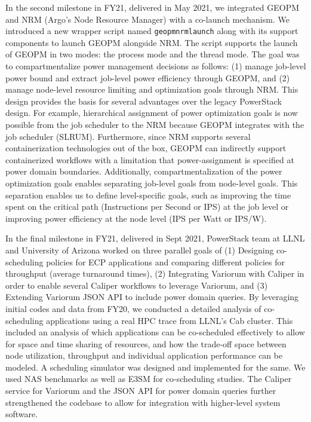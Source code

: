 In the second milestone in FY21, delivered in May 2021, we integrated GEOPM and NRM (Argo's Node Resource Manager) with a co-launch mechanism. We introduced a new wrapper script named \texttt{geopmnrmlaunch} along with its support components to launch GEOPM alongside NRM. The script supports the launch of GEOPM in two modes: the process mode and the thread mode. The goal was to compartmentalize power management decisions as follows: (1) manage job-level power bound and extract job-level power efficiency through GEOPM, and (2) manage node-level resource limiting and optimization goals through NRM. This design provides the basis for several advantages over the legacy PowerStack design. For example, hierarchical assignment of power optimization goals is now possible from the job scheduler to the NRM because GEOPM integrates with the job scheduler (SLRUM). Furthermore, since NRM supports several containerization technologies out of the box, GEOPM can indirectly support containerized workflows with a limitation that power-assignment is specified at power domain boundaries. Additionally, compartmentalization of the power optimization goals enables separating job-level goals from node-level goals. This separation enables us to define level-specific goals, such as improving the time spent on the critical path (Instructions per Second or IPS) at the job level or improving power efficiency at the node level (IPS per Watt or IPS/W). 

In the final milestone in FY21, delivered in Sept 2021, PowerStack team at LLNL and University of Arizona worked on three parallel goals of (1) Designing co-scheduling policies for ECP applications and comparing different policies for throughput (average turnaround times), (2) Integrating Variorum with Caliper in order to enable several Caliper workflows to leverage Variorum, and (3) Extending Variorum JSON API to include power domain queries. By leveraging initial codes and data from FY20, we conducted a detailed analysis of co-scheduling applications using a real HPC trace from LLNL’s Cab cluster. This included an analysis of which applications can be co-scheduled effectively to allow for space and time sharing of resources, and how the trade-off space between node utilization, throughput and individual application performance can be modeled. A scheduling simulator was designed and implemented for the same. We used NAS benchmarks as well as E3SM for co-scheduling studies. The Caliper service for Variorum and the JSON API for power domain queries further strengthened the codebase to allow for integration with higher-level system software. 

